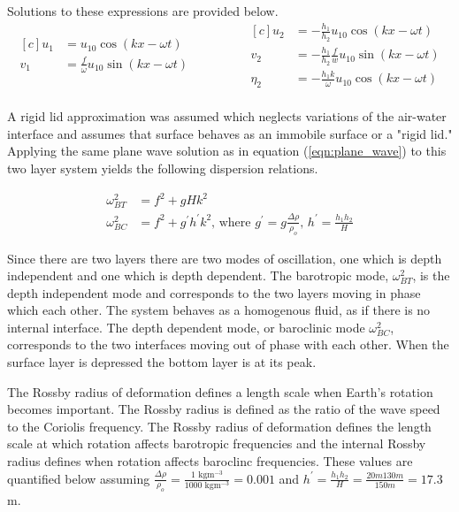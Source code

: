 Solutions to these expressions are provided below. %
\begin{equation*}
\begin{aligned}[c]
	 u_{1}  &= u_{10} \cos(kx-\omega t) \\
	 v_{1}  &=\frac{f}{\omega} u_{10} \sin(kx-\omega t) \\
\end{aligned}
\qquad\ \qquad
\begin{aligned}[c]
	 u_{2}  &=-\frac{h_{1}}{h_{2}} u_{10} \cos(kx-\omega t) \\
	 v_{2}  &=-\frac{h_{1}}{h_{2}}\frac{f}{w} u_{10} \sin(kx-\omega t) \\
	  \eta _{2}  &=-\frac{h_{1}k}{\omega} u_{10} \cos(kx-\omega t ) \\
\end{aligned}
\end{equation*}

A rigid lid approximation was assumed which neglects variations of the air-water interface and assumes that surface behaves as an immobile surface or a "rigid lid." Applying the same
plane wave solution as in equation (\ref{eqn:plane_wave}) to this two layer system yields the following dispersion relations.

\begin{align*}
	\omega^2_{BT}&=f^2+gHk^2 \\
	\omega^2_{BC}&=f^2+g^{\prime}h^{\prime}k^2 \text{, \ \ where \ \ }  g^{\prime}=g\frac{\Delta \rho}{\rho_o} \text{,\ \ \ } h^{\prime}= \frac{h_1h_2}{H}
\end{align*}

Since there are two layers there are two modes of oscillation, one which is depth independent and one which is depth dependent.  The barotropic mode, $\omega^2_{BT}$, is the depth independent mode and corresponds to the two layers moving in phase which each other. The system  behaves as a homogenous fluid, as if there is no internal interface. The depth dependent mode, or  baroclinic mode $\omega^2_{BC}$, corresponds to the two interfaces moving out of phase with each other. When the surface layer is depressed the bottom layer is at its peak.

The Rossby radius of deformation defines a length scale when Earth's rotation becomes important. The Rossby radius is defined as the ratio of the wave speed to the
Coriolis frequency. The Rossby radius of deformation defines the length scale at which rotation affects barotropic frequencies and the internal Rossby radius defines when
rotation affects baroclinc frequencies. These values are quantified below assuming $\frac{\Delta \rho}{\rho_o} = \frac{1  \text{ kgm$^{-3}$}}{1000 \text{ kgm$^{-3}$}}=0.001$
and $h^{\prime}=\frac{h_1h_2}{H}=\frac{20m 130m}{150m}=17.3$ m.

